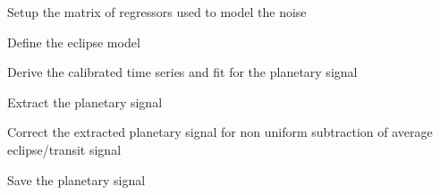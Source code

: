 \documentclass[a4paper,10pt,english]{sphinxmanual}
\begin{document}
Setup the matrix of regressors used to model the noise

%
\begin{sphinxVerbatim}[commandchars=\\\{\}]
\end{sphinxVerbatim}

Define the eclipse model

%
\begin{sphinxVerbatim}[commandchars=\\\{\}]
\end{sphinxVerbatim}

Derive the calibrated time series and fit for the planetary signal

%
\begin{sphinxVerbatim}[commandchars=\\\{\}]
\end{sphinxVerbatim}

Extract the planetary signal

%
\begin{sphinxVerbatim}[commandchars=\\\{\}]
\end{sphinxVerbatim}

Correct the extracted planetary signal for non uniform subtraction of average eclipse/transit signal

%
\begin{sphinxVerbatim}[commandchars=\\\{\}]
\end{sphinxVerbatim}

Save the planetary signal

%
\begin{sphinxVerbatim}[commandchars=\\\{\}]
\end{sphinxVerbatim}
\end{document}
